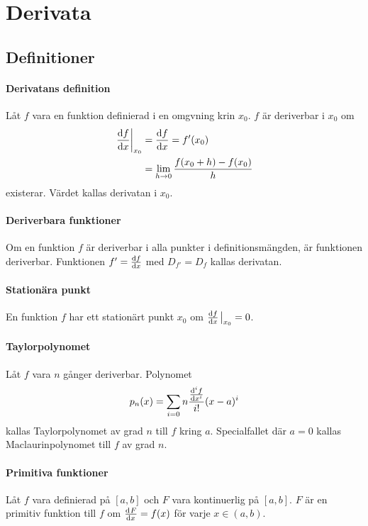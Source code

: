 \section{Derivata}

\subsection{Definitioner}

\paragraph{Derivatans definition}
Låt $f$ vara en funktion definierad i en omgvning krin $x_0$. $f$ är deriverbar i $x_0$ om
\begin{align*}
	\eval{\dv{f}{x}}_{x_0} &= \dv{f}{x} (x_0) = f'(x_0) \\
	                           &= \lim\limits_{h\to 0}\frac{f(x_0 + h) - f(x_0)}{h}
\end{align*}
existerar. Värdet kallas derivatan i $x_0$.

\paragraph{Deriverbara funktioner}
Om en funktion $f$ är deriverbar i alla punkter i definitionsmängden, är funktionen deriverbar. Funktionen $f' = \dv{f}{x}$ med $D_{f'} = D_f$ kallas derivatan.

\paragraph{Stationära punkt}
En funktion $f$ har ett stationärt punkt $x_0$ om $\dv{f}{x}\eval_{x_0} = 0$.

\paragraph{Taylorpolynomet}
Låt $f$ vara $n$ gånger deriverbar. Polynomet
\begin{align*}
	p_n(x) = \sum\limits_{i = 0}{n}\frac{\dv[i]{f}{x} (0)}{i!}(x - a)^i
\end{align*}
kallas Taylorpolynomet av grad $n$ till $f$ kring $a$. Specialfallet där $a = 0$ kallas Maclaurinpolynomet till $f$ av grad $n$.

\paragraph{Primitiva funktioner}
Låt $f$ vara definierad på $[a, b]$ och $F$ vara kontinuerlig på $[a, b]$. $F$ är en primitiv funktion till $f$ om $\dv[]{F}{x} (x) = f(x)$ för varje $x\in (a, b)$.


